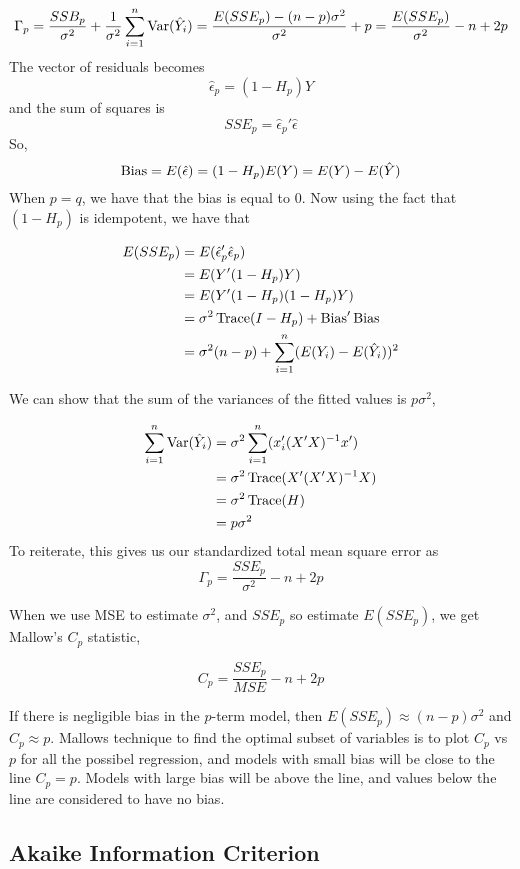 \[\Gamma_p = \frac{SSB_p}{\sigma^2} + \frac{1}{\sigma^2}\sum_{i=1}^n\operatorname{Var}(\hat{Y}_i) = \frac{E(SSE_p) - (n-p)\sigma^2}{\sigma^2} + p = \frac{E(SSE_p)}{\sigma^2} - n + 2p\]
\noindent
The vector of residuals becomes 
\[\hat{\epsilon}_p = (1 - H_p)Y\]
and the sum of squares is 
\[SSE_p = \hat{\epsilon}_p'\hat{\epsilon}\]
So, 
\[\operatorname{Bias} = E(\hat{\epsilon}) = (1-H_p)E(Y) = E(Y) - E(\hat{Y})\]
When $p=q$, we have that the bias is equal to 0. Now using the fact that $(1-H_p)$ is idempotent, we have that

\begin{align*}
    E(SSE_p) &= E(\hat{\epsilon}_p'\hat{\epsilon}_p)\\
             &= E(Y'(1-H_p)Y)\\
             &= E(Y'(1-H_p)(1-H_p)Y)\\
             &= \sigma^2\operatorname{Trace}(I-H_p) + \operatorname{Bias}'\operatorname{Bias}\\
             &= \sigma^2(n-p) + \sum_{i=1}^n (E(Y_i) - E(\hat{Y}_i))^2\\
\end{align*}

We can show that the sum of the variances of the fitted values is $p\sigma^2$, 

\begin{align*}
    \sum_{i=1}^n \operatorname{Var}(\hat{Y}_i) &= \sigma^2 \sum_{i=1}^n (x_i'(X'X)^{-1}x')\\
    &= \sigma^2\operatorname{Trace}(X'(X'X)^{-1}X)\\
    &= \sigma^2\operatorname{Trace}(H)\\
    &= p\sigma^2
\end{align*}
To reiterate, this gives us our standardized total mean square error as
\[\Gamma_p = \frac{SSE_p}{\sigma^2} - n + 2p\]

When we use MSE to estimate $\sigma^2$, and $SSE_p$ so estimate $E(SSE_p)$, we get Mallow's $C_p$ statistic,

\[C_p = \frac{SSE_p}{MSE} - n + 2p\]

If there is negligible bias in the $p$-term model, then $E(SSE_p) \approx (n-p)\sigma^2$ and $C_p \approx p$. Mallows technique to find the optimal subset of variables is to plot $C_p$ vs $p$ for all the possibel regression, and models with small bias will be close to the line $C_p = p$. Models with large bias will be above the line, and values below the line are considered to have no bias. 

\subsection{Akaike Information Criterion}

